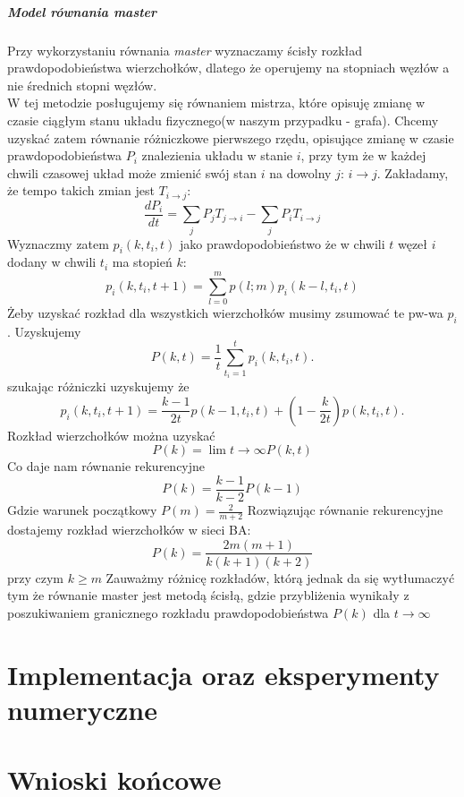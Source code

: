 \documentclass{article}
\def\lecturemark{}
\newcommand{\spr}[1]{\part{#1}\def\lecturemark{\partname\ \thepart: #1}}
\renewcommand{\partname}{Sprawozdanie}
\renewcommand{\thepart}{\arabic{part}}
\begin{document}
\subsubsection{Model równania \textit{master}}
	Przy wykorzystaniu równania \textit{master} wyznaczamy ścisły rozkład prawdopodobieństwa wierzchołków, dlatego że operujemy na stopniach węzłów a nie średnich stopni węzłów.\\W tej metodzie posługujemy się równaniem mistrza, które opisuję zmianę w czasie ciągłym  stanu układu fizycznego(w naszym przypadku - grafa). Chcemy uzyskać zatem równanie różniczkowe pierwszego rzędu, opisujące zmianę w czasie prawdopodobieństwa $P_i$ znalezienia układu w stanie $i$, przy tym że w każdej chwili czasowej układ może zmienić swój stan $i$ na dowolny $j$: $ i \rightarrow j$. Zakładamy, że tempo takich zmian jest $T_{i \rightarrow j}$:
	\begin{equation}
	\frac{dP_i}{dt} = \sum_{j} P_jT_{j \rightarrow i} - \sum_{j} P_iT_{i \rightarrow j}
	\end{equation}
	Wyznaczmy zatem $p_i(k, t_i, t)$ jako prawdopodobieństwo że w chwili $t$ węzeł $i$ dodany w chwili $t_i$ ma stopień $k$:
	\begin{equation}\label{prw}
		p_i(k, t_i, t + 1) = \sum_{l=0}^m p(l;m)p_i(k - l, t_i, t)		
	\end{equation}
	Żeby uzyskać rozkład dla wszystkich wierzchołków musimy zsumować te pw-wa $p_i$. Uzyskujemy 
	\begin{equation}
		P(k, t) = \frac{1}{t} \sum_{t_i=1}^t p_i(k,t_i,t).
	\end{equation}
	szukając różniczki uzyskujemy że 
	\begin{equation}
		p_i(k, t_i, t + 1) = \frac{k - 1}{2t}p(k - 1, t_i, t) + (1 - \frac{k}{2t})p(k,t_i, t).
	\end{equation}
	Rozkład wierzchołków można uzyskać 
	\begin{equation}
		P(k) = \lim {t \to \infty} P(k, t)
	\end{equation}
	Co daje nam równanie rekurencyjne
	\begin{equation}
		P(k) = \frac{k - 1}{k - 2}P(k -1)
	\end{equation}
	Gdzie warunek początkowy $P(m) = \frac{2}{m + 2}$
	Rozwiązując równanie rekurencyjne dostajemy rozkład wierzchołków w sieci BA:
	\begin{equation}
		P(k) = \frac{2m(m + 1)}{k(k + 1)(k + 2)}
	\end{equation}
	przy czym $k \geq m$
Zauważmy różnicę rozkładów, którą jednak da się wytłumaczyć tym że równanie master jest metodą ścisłą, gdzie przybliżenia wynikały z poszukiwaniem granicznego rozkładu prawdopodobieństwa $P(k)$ dla $t \rightarrow \infty$
\spr{Implementacja oraz eksperymenty numeryczne}
\spr{Wnioski końcowe}
{}

\end{document}

